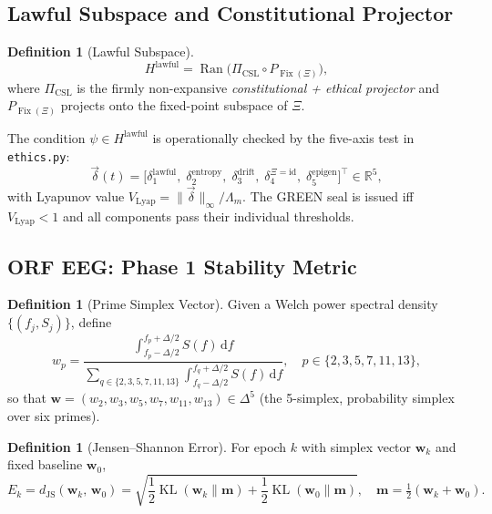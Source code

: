 \documentclass[12pt,a4paper]{article}
\theoremstyle{plain}
\theoremstyle{definition}
\newtheorem{definition}[theorem]{Definition}
\newcommand{\Hlawful}{H^{\mathrm{lawful}}}
\newcommand{\PiCSL}{\Pi_{\mathrm{CSL}}}
\newcommand{\Lambdam}{\Lambda_m}
\newcommand{\dJS}{d_{\mathrm{JS}}}
\newcommand{\RR}{\mathbb{R}}
\newcommand{\primes}{\{2,3,5,7,11,13\}}
\begin{document}
\subsection{Lawful Subspace and Constitutional Projector}
\label{sec:math:lawful}

\begin{definition}[Lawful Subspace]
\begin{equation}
  \Hlawful = \operatorname{Ran}\!\bigl(\PiCSL \circ P_{\operatorname{Fix}(\Xi)}\bigr),
  \label{eq:lawful}
\end{equation}
where $\PiCSL$ is the firmly non-expansive \emph{constitutional + ethical projector}
and $P_{\operatorname{Fix}(\Xi)}$ projects onto the fixed-point subspace of $\Xi$.
\end{definition}

\noindent The condition $\psi \in \Hlawful$ is operationally checked by the five-axis
test in \texttt{ethics.py}:
\begin{equation}
  \vec{\delta}(t) = \bigl[\delta_1^{\mathrm{lawful}},\;
                           \delta_2^{\mathrm{entropy}},\;
                           \delta_3^{\mathrm{drift}},\;
                           \delta_4^{\Xi=\mathrm{id}},\;
                           \delta_5^{\mathrm{epigen}}\bigr]^\top \in \RR^5,
  \label{eq:vecdelta}
\end{equation}
with Lyapunov value $V_{\mathrm{Lyap}} = \|\vec{\delta}\|_\infty / \Lambdam$.
The GREEN seal is issued iff $V_{\mathrm{Lyap}} < 1$ and all components pass their
individual thresholds.

\subsection{ORF EEG: Phase 1 Stability Metric}
\label{sec:math:phase1}

\begin{definition}[Prime Simplex Vector]
Given a Welch power spectral density $\{(f_j, S_j)\}$, define
\begin{equation}
  w_p = \frac{\int_{f_p - \Delta/2}^{f_p + \Delta/2} S(f)\,\mathrm{d}f}
             {\sum_{q \in \primes}\int_{f_q - \Delta/2}^{f_q + \Delta/2} S(f)\,\mathrm{d}f},
  \quad p \in \primes,
  \label{eq:simplex}
\end{equation}
so that $\mathbf{w} = (w_2, w_3, w_5, w_7, w_{11}, w_{13}) \in \Delta^5$
(the 5-simplex, probability simplex over six primes).
\end{definition}

\begin{definition}[Jensen--Shannon Error]
For epoch $k$ with simplex vector $\mathbf{w}_k$ and fixed baseline $\mathbf{w}_0$,
\begin{equation}
  E_k = \dJS(\mathbf{w}_k,\, \mathbf{w}_0)
      = \sqrt{\frac{1}{2}\operatorname{KL}(\mathbf{w}_k \| \mathbf{m})
            + \frac{1}{2}\operatorname{KL}(\mathbf{w}_0 \| \mathbf{m})},
  \quad \mathbf{m} = \tfrac{1}{2}(\mathbf{w}_k + \mathbf{w}_0).
  \label{eq:jse}
\end{equation}
\end{definition}
\end{document}

